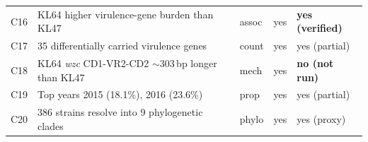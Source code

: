 \documentclass[11pt]{article}
\begin{document}
\begin{longtable}{@{}p{0.8cm}p{7cm}p{2cm}p{2cm}p{2.5cm}@{}}
C16 & KL64 higher virulence-gene burden than KL47                          & assoc & yes & \textbf{yes (verified)} \\
C17 & 35 differentially carried virulence genes                             & count & yes & yes (partial) \\
C18 & KL64 \emph{wzc} CD1-VR2-CD2 $\sim$303\,bp longer than KL47           & mech  & yes & \textbf{no (not run)} \\
C19 & Top years 2015 (18.1\%), 2016 (23.6\%)                                & prop  & yes & yes (partial) \\
C20 & 386 strains resolve into 9 phylogenetic clades                        & phylo & yes & yes (proxy) \\
\bottomrule
\end{longtable}
\end{document}
